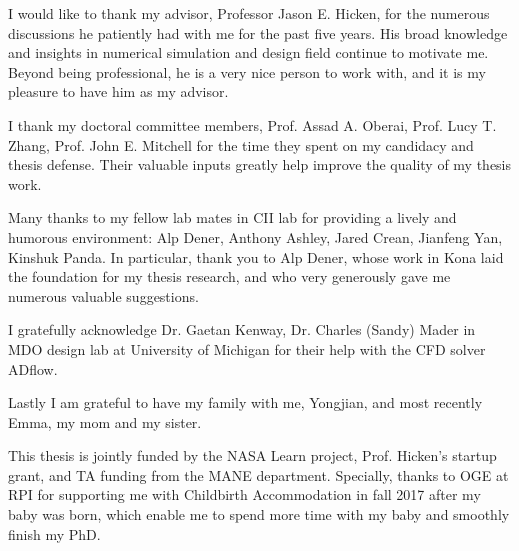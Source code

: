  
 

I would like to thank my advisor, Professor Jason E. Hicken, for the numerous discussions he patiently had with me 
for the past five years. His broad knowledge and insights in numerical simulation and design field continue to motivate me.  Beyond being professional, he is a very nice person to work with, and it is my pleasure to have him as my advisor. 

I thank my doctoral committee members, Prof. Assad A. Oberai, Prof. Lucy T. Zhang, Prof. John E. Mitchell for the time they spent on my candidacy and thesis defense. Their valuable inputs greatly help improve the quality of my thesis work. 

Many thanks to my fellow lab mates in CII lab for providing a lively and humorous environment: Alp Dener, Anthony Ashley,  Jared Crean, Jianfeng Yan, Kinshuk Panda. In particular, thank you to Alp Dener, whose work in Kona laid the foundation for my thesis research, and who very generously gave me numerous valuable suggestions. 

I gratefully acknowledge Dr. Gaetan Kenway, Dr. Charles (Sandy) Mader in MDO design lab at University of Michigan for their help with the CFD solver ADflow. 

Lastly I am grateful to have my family with me, Yongjian, and most recently Emma, my mom and my sister. 

%

This thesis is jointly funded by the NASA Learn project, Prof. Hicken's startup grant, and TA funding from the MANE department. Specially, thanks to OGE at RPI for supporting me with Childbirth Accommodation in fall 2017 after my baby was born, which enable me to spend more time with my baby and smoothly finish my PhD. 
